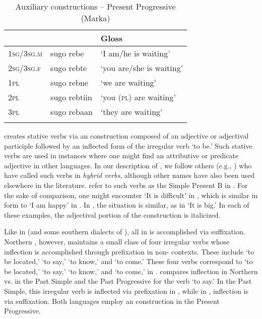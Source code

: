 \documentclass[output=paper,modfonts,nonflat,
colorlinks, citecolor=brown,
draftmode
]{langsci/langscibook}
\begin{document}
 \begin{table}
 	\caption{{Auxiliary constructions -- Present Progressive (Marka)}}
 	\label{tab:1:Auxiliary}
 	\begin{tabularx}{\textwidth}{Xll} 
 		\lsptoprule
 		& \ilit{Marka}   & Gloss    \\
 		\midrule
 		1\textsc{sg}/3\textsc{sg.m} & sugo rebe & `I am/he is waiting' \\
 		2\textsc{sg}/3\textsc{sg.f} & sugo rebte  & `you are/she is waiting'  \\
 		1\textsc{pl} & sugo rebne & `we are waiting'  \\
 		2\textsc{pl} & sugo rebtiin & `you (\textsc{pl}) are waiting'  \\
 		3\textsc{pl} & sugo rebaan & `they are waiting'  \\
 		\lspbottomrule
 	\end{tabularx}
 \end{table}
 
  creates stative verbs via an  construction composed of an adjective or adjectival participle followed by an inflected form of the irregular verb  `to be.' Such stative verbs are used in instances where one might find an attributive or predicate adjective in other languages. In our description of , we follow others (e.g., \citealt{Andrzejewski1969,AjelloPuglielli1988}) who have called such verbs in  \textit{hybrid verbs}, although other names have also been used elsewhere in the literature. \citet{PasterRanero2015} refer to such verbs as the Simple Present B in . For the sake of comparison, one might encounter  `It is difficult' in , which is similar in form to  `I am happy' in . In , the situation is similar, as in  `It is big.' In each of these examples, the adjectival portion of the  construction is italicized.
 
 Like in  (and some southern dialects of ), all  in  is accomplished via suffixation. Northern , however, maintains a small class of four irregular verbs whose inflection is accomplished through prefixation in non- contexts. These include  `to be located,'  `to say,'  `to know,' and  `to come.' These four verbs correspond to  `to be located,'  `to say,'  `to know,' and  `to come,' in .  compares inflection in Northern  vs.  in the Past Simple and the Past Progressive for the verb `to say.' In the Past Simple, this irregular verb is inflected via prefixation in , while in , inflection is via suffixation. Both languages employ an  construction in the Present Progressive.
 
\end{document}
